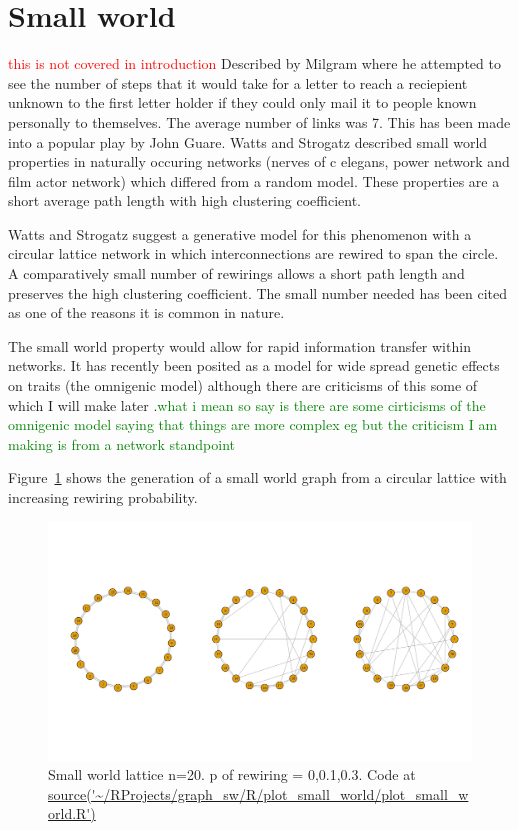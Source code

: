 
\section{Small world}
\label{sec:Small world}
\textcolor{red}{this is not covered in introduction}
Described by Milgram \cite{milgram1967small} where he attempted to see the number of steps that it would take for a letter to reach a reciepient unknown to the first letter holder if they could only mail it to people known personally to themselves. The average number of links was 7. This has been made into a popular play by John Guare. Watts and Strogatz \cite{watts1998collective} described small world properties in naturally occuring networks (nerves of c elegans, power network and film actor network) which differed from a random model. These properties are a short average path length with high clustering coefficient. 

Watts and Strogatz \cite{watts1998collective} suggest a generative model for this phenomenon with a circular lattice network in which interconnections are rewired to span the circle. A comparatively small number of rewirings allows a short path length and preserves the high clustering coefficient. The small number needed has been cited as one of the reasons it is common in nature. 

The small world property would allow for rapid information transfer within networks. It has recently been posited as a model for wide spread genetic effects on traits (the omnigenic model) \cite{boyle2017expanded} although there are criticisms of this some of which I will make later .\textcolor{green}{what i mean so say is there are some cirticisms of the omnigenic model saying that things are more complex eg \cite{wray2018common} \cite{boyle2017omnigenic_response}  but the criticism I am making is from a network standpoint} 

Figure~\ref{fig:small_world} shows the generation of a small world graph from a circular lattice with increasing rewiring probability.

\begin{figure}
    \centering
    \includegraphics[width=\textwidth]{images/Rplot_corrected_small_world.png}
    \caption{Small world lattice n=20. p of rewiring = 0,0.1,0.3. Code at \url{source('~/RProjects/graph_sw/R/plot_small_world/plot_small_world.R')}}
    \label{fig:small_world}
\end{figure}

